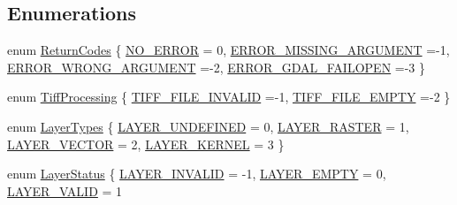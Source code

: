 \subsection*{Enumerations}
\begin{DoxyCompactItemize}
\item 
enum \hyperlink{namespacelad_ae993cfd07f4d265c16a63f6c9653f5a1}{Return\+Codes} \{ \hyperlink{namespacelad_ae993cfd07f4d265c16a63f6c9653f5a1a9d833d4d0a300da206f3757b6b06866c}{N\+O\+\_\+\+E\+R\+R\+OR} = 0, 
\hyperlink{namespacelad_ae993cfd07f4d265c16a63f6c9653f5a1a355a99f44ac92d474b433ac9552d5a6a}{E\+R\+R\+O\+R\+\_\+\+M\+I\+S\+S\+I\+N\+G\+\_\+\+A\+R\+G\+U\+M\+E\+NT} =-\/1, 
\hyperlink{namespacelad_ae993cfd07f4d265c16a63f6c9653f5a1a9f51dc4e24309a43392ea7ef8f4817c9}{E\+R\+R\+O\+R\+\_\+\+W\+R\+O\+N\+G\+\_\+\+A\+R\+G\+U\+M\+E\+NT} =-\/2, 
\hyperlink{namespacelad_ae993cfd07f4d265c16a63f6c9653f5a1a627f543fadbe28f8b8216be9d2854316}{E\+R\+R\+O\+R\+\_\+\+G\+D\+A\+L\+\_\+\+F\+A\+I\+L\+O\+P\+EN} =-\/3
 \}
\item 
enum \hyperlink{namespacelad_a87db856c2eb4b013d2489fc6d8402865}{Tiff\+Processing} \{ \hyperlink{namespacelad_a87db856c2eb4b013d2489fc6d8402865a0a8870679bc97c7d54d0da921643001a}{T\+I\+F\+F\+\_\+\+F\+I\+L\+E\+\_\+\+I\+N\+V\+A\+L\+ID} =-\/1, 
\hyperlink{namespacelad_a87db856c2eb4b013d2489fc6d8402865acbc7c70ce812baf4058438e4358169e4}{T\+I\+F\+F\+\_\+\+F\+I\+L\+E\+\_\+\+E\+M\+P\+TY} =-\/2
 \}
\item 
enum \hyperlink{namespacelad_ae6bf3485d13645763a223d5ff5d519ca}{Layer\+Types} \{ \hyperlink{namespacelad_ae6bf3485d13645763a223d5ff5d519caaf3efed4af95eb04ac729fcd4a593b738}{L\+A\+Y\+E\+R\+\_\+\+U\+N\+D\+E\+F\+I\+N\+ED} = 0, 
\hyperlink{namespacelad_ae6bf3485d13645763a223d5ff5d519caad898b26244c3664f4c015106ce760aab}{L\+A\+Y\+E\+R\+\_\+\+R\+A\+S\+T\+ER} = 1, 
\hyperlink{namespacelad_ae6bf3485d13645763a223d5ff5d519caa7ce0aae755ad0f0ab207ae1e1056c45b}{L\+A\+Y\+E\+R\+\_\+\+V\+E\+C\+T\+OR} = 2, 
\hyperlink{namespacelad_ae6bf3485d13645763a223d5ff5d519caab0969eed012a7eb3a60b7c2b1acd0b7d}{L\+A\+Y\+E\+R\+\_\+\+K\+E\+R\+N\+EL} = 3
 \}
\item 
enum \hyperlink{namespacelad_adf170a4dcc28fe5e14432157c9a5cbb3}{Layer\+Status} \{ \hyperlink{namespacelad_adf170a4dcc28fe5e14432157c9a5cbb3a29a3cbcedd21a0998809a60f79c35ab0}{L\+A\+Y\+E\+R\+\_\+\+I\+N\+V\+A\+L\+ID} = -\/1, 
\hyperlink{namespacelad_adf170a4dcc28fe5e14432157c9a5cbb3a8b95f5cb123f375bc004ab21466d0bed}{L\+A\+Y\+E\+R\+\_\+\+E\+M\+P\+TY} = 0, 
\hyperlink{namespacelad_adf170a4dcc28fe5e14432157c9a5cbb3a8ec676b95fc9e8d6196fa65c1b7b0a42}{L\+A\+Y\+E\+R\+\_\+\+V\+A\+L\+ID} = 1

\end{DoxyCompactItemize}
